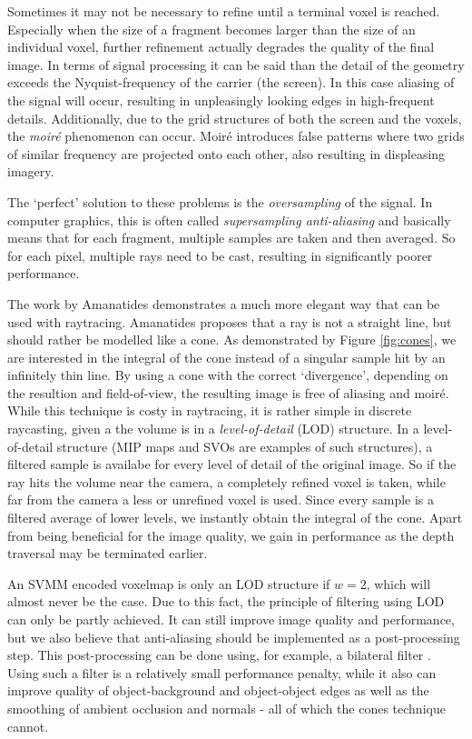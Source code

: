 %
Sometimes it may not be necessary to refine until a terminal voxel is reached. Especially when the size of a fragment becomes larger than the size of an individual voxel, further refinement actually degrades the quality of the final image. In terms of signal processing it can be said than the detail of the geometry exceeds the Nyquist-frequency of the carrier (the screen). In this case aliasing of the signal will occur, resulting in unpleasingly looking edges in high-frequent details. Additionally, due to the grid structures of both the screen and the voxels, the \emph{moir\'e} phenomenon can occur. Moir\'e introduces false patterns where two grids of similar frequency are projected onto each other, also resulting in displeasing imagery.

The `perfect' solution to these problems is the \emph{oversampling} of the signal. In computer graphics, this is often called \emph{supersampling anti-aliasing} \cite{crow77} and basically means that for each fragment, multiple samples are taken and then averaged. So for each pixel, multiple rays need to be cast, resulting in significantly poorer performance.

The work by Amanatides \cite{amanatides84} demonstrates a much more elegant way that can be used with raytracing. Amanatides proposes that a ray is not a straight line, but should rather be modelled like a cone. As demonstrated by Figure \ref{fig:cones}, we are interested in the integral of the cone instead of a singular sample hit by an infinitely thin line. By using a cone with the correct `divergence', depending on the resultion and field-of-view, the resulting image is free of aliasing and moir\'e. While this technique is costy in raytracing, it is rather simple in discrete raycasting, given a the volume is in a \emph{level-of-detail} (LOD) structure.
%
In a level-of-detail structure (MIP maps and SVOs are examples of such structures), a filtered sample is availabe for every level of detail of the original image. So if the ray hits the volume near the camera, a completely refined voxel is taken, while far from the camera a less or unrefined voxel is used. Since every sample is a filtered average of lower levels, we instantly obtain the integral of the cone. Apart from being beneficial for the image quality, we gain in performance as the depth traversal may be terminated earlier.

An SVMM encoded voxelmap is only an LOD structure if $w=2$, which will almost never be the case. Due to this fact, the principle of filtering using LOD can only be partly achieved. It can still improve image quality and performance, but we also believe that anti-aliasing should be implemented as a post-processing step. This post-processing can be done using, for example, a bilateral filter \cite{eisemann04}. Using such a filter is a relatively small performance penalty, while it also can improve quality of object-background and object-object edges as well as the smoothing of ambient occlusion and normals - all of which the cones technique cannot.
%
